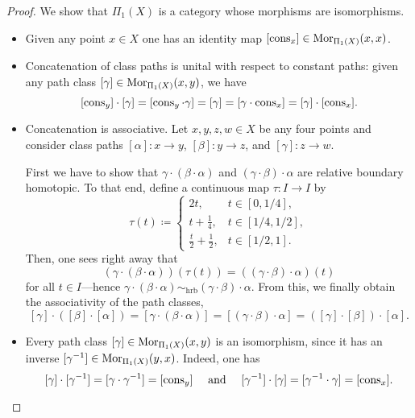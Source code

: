 \begin{proof}
    We show that \(\Pi_1(X)\) is a category whose morphisms are isomorphisms.
    \begin{itemize}\setlength\itemsep{0em}
        \item Given any point \(x \in X\) one has an identity map
              \([\operatorname{cons}_x] \in \operatorname{Mor}_{\Pi_1(X)}(x, x)\).

        \item Concatenation of class paths is unital with respect to constant paths:
              given any path class \([\gamma] \in \operatorname{Mor}_{\Pi_1(X)}(x, y)\), we have
              \[
                  [\operatorname{cons}_y] \cdot [\gamma]
                  = [\operatorname{cons}_y \cdot \gamma]
                  = [\gamma]
                  = [\gamma \cdot \operatorname{cons}_x]
                  = [\gamma] \cdot [\operatorname{cons}_x].
              \]

        \item Concatenation is associative. Let \(x, y, z, w \in X\) be any four points
              and consider class paths \([\alpha]: x \to y\), \([\beta]: y \to z\), and
              \([\gamma]: z \to w\).

              First we have to show that \(\gamma \cdot (\beta \cdot \alpha)\) and
              \((\gamma \cdot \beta) \cdot \alpha\) are relative boundary homotopic. To that
              end, define a continuous map \(\tau: I \to I\) by
              \[
                  \tau(t) \coloneq
                  \begin{cases}
                      2 t,                       & t \in [0, 1/4],   \\
                      t + \frac{1}{4},           & t \in [1/4, 1/2], \\
                      \frac{t}{2} + \frac{1}{2}, & t \in [1/2, 1].
                  \end{cases}
              \]
              Then, one sees right away that
              \[
                  (\gamma \cdot (\beta \cdot \alpha))(\tau(t))
                  = ((\gamma \cdot \beta) \cdot \alpha)(t)
              \]
              for all \(t \in I\)---hence \(\gamma \cdot (\beta \cdot \alpha)
              \sim_{\text{hrb}} (\gamma \cdot \beta) \cdot \alpha\). From this, we finally
              obtain the associativity of the path classes,
              \[
                  [\gamma] \cdot ([\beta] \cdot [\alpha])
                  = [\gamma \cdot (\beta \cdot \alpha)]
                  = [(\gamma \cdot \beta) \cdot \alpha]
                  = ([\gamma] \cdot [\beta]) \cdot [\alpha].
              \]

        \item Every path class \([\gamma] \in \operatorname{Mor}_{\Pi_1(X)}(x, y)\) is an isomorphism,
              since it has an inverse \([\gamma^{-1}] \in \operatorname{Mor}_{\Pi_1(X)}(y, x)\). Indeed,
              one has
              \[
                  [\gamma] \cdot [\gamma^{-1}] = [\gamma \cdot \gamma^{-1}] = [\operatorname{cons}_y]
                  \quad\text{ and }\quad
                  [\gamma^{-1}] \cdot [\gamma] = [\gamma^{-1} \cdot \gamma] = [\operatorname{cons}_x].
              \]
    \end{itemize}
\end{proof}

